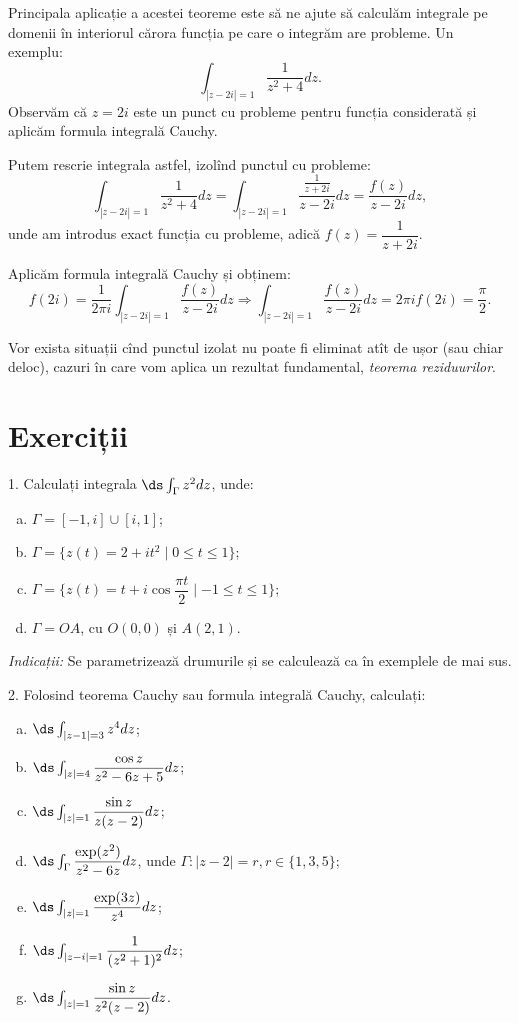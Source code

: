 Principala aplicație a acestei teoreme este să ne ajute să calculăm integrale pe
domenii în interiorul cărora funcția pe care o integrăm are probleme. Un exemplu:
\[
  \int_{|z - 2i| = 1} \dfrac{1}{z^2 + 4} dz.
\]
Observăm că $ z = 2i $ este un punct cu probleme pentru funcția considerată și
aplicăm formula integrală Cauchy.

Putem rescrie integrala astfel, izolînd punctul cu probleme:
\[
  \int_{|z - 2i| = 1} \dfrac{1}{z^2 + 4} dz = \int_{|z - 2i| = 1} \dfrac{\frac{1}{z + 2i}}{z - 2i} dz = %
  \dfrac{f(z)}{z - 2i} dz,
\]
unde am introdus exact funcția cu probleme, adică $ f(z) = \dfrac{1}{z + 2i} $.

Aplicăm formula integrală Cauchy și obținem:
\[
  f(2i) = \dfrac{1}{2\pi i} \int_{|z - 2i| = 1} \dfrac{f(z)}{z - 2i} dz \Rightarrow %
  \int_{|z - 2i| = 1} \dfrac{f(z)}{z - 2i} dz = 2\pi i f(2i) = \dfrac{\pi}{2}.
\]

Vor exista situații cînd punctul izolat nu poate fi eliminat atît de ușor (sau chiar deloc),
cazuri în care vom aplica un rezultat fundamental, \emph{teorema reziduurilor}.


\section{Exerciții}

1. Calculați integrala $ \ds\int_{\Gamma} z^2 dz $, unde:
\begin{enumerate}[(a)]
\item $ \Gamma = [-1, i] \cup [i, 1] $;
\item $ \Gamma = \{ z(t) = 2 + it^2 \mid 0 \leq t \leq 1 \} $;
\item $ \Gamma = \{ z(t) = t + i \cos \dfrac{\pi t}{2} \mid -1 \leq t \leq 1 \} $;
\item $ \Gamma = OA $, cu $O(0, 0) $ și $ A(2, 1) $.
\end{enumerate}

\emph{Indicații:} Se parametrizează drumurile și se calculează ca în exemplele
de mai sus.

\vspace{1cm}

2. Folosind teorema Cauchy sau formula integrală Cauchy, calculați:
\begin{enumerate}[(a)]
\item $ \ds\int_{|z - 1| = 3} z^4 dz $;
\item $ \ds\int_{|z| = 4} \dfrac{\cos z}{z^2 - 6z + 5}dz $;
\item $ \ds\int_{|z| = 1} \dfrac{\sin z}{z(z-2)} dz $;
\item $ \ds\int_\Gamma \dfrac{\exp(z^2)}{z^2 - 6z} dz $, unde
  $ \Gamma: |z - 2| = r, r \in \{1, 3, 5\} $;
\item $ \ds\int_{|z| = 1} \dfrac{\exp(3z)}{z^4} dz $;
\item $ \ds\int_{|z - i| = 1} \dfrac{1}{(z^2 + 1)^2} dz $;
\item $ \ds\int_{|z| = 1} \dfrac{\sin z}{z^2(z - 2)} dz $.
\end{enumerate}

